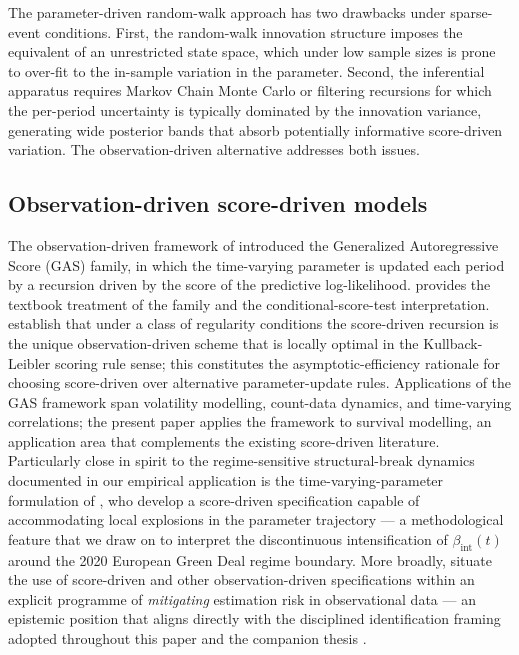 \documentclass[12pt,a4paper]{article}
\newcommand{\bint}{\beta_{\text{int}}}
\theoremstyle{plain}
\theoremstyle{definition}
\begin{document}
The parameter-driven random-walk approach has two drawbacks under sparse-event conditions. First, the random-walk innovation structure imposes the equivalent of an unrestricted state space, which under low sample sizes is prone to over-fit to the in-sample variation in the parameter. Second, the inferential apparatus requires Markov Chain Monte Carlo or filtering recursions for which the per-period uncertainty is typically dominated by the innovation variance, generating wide posterior bands that absorb potentially informative score-driven variation. The observation-driven alternative addresses both issues.

\subsection{Observation-driven score-driven models}

The observation-driven framework of \cite{creal2008general, creal2013generalized} introduced the Generalized Autoregressive Score (GAS) family, in which the time-varying parameter is updated each period by a recursion driven by the score of the predictive log-likelihood. \cite{harvey2013dynamic} provides the textbook treatment of the family and the conditional-score-test interpretation. \cite{blasques2015robust} establish that under a class of regularity conditions the score-driven recursion is the unique observation-driven scheme that is locally optimal in the Kullback-Leibler scoring rule sense; this constitutes the asymptotic-efficiency rationale for choosing score-driven over alternative parameter-update rules. Applications of the GAS framework span volatility modelling, count-data dynamics, and time-varying correlations; the present paper applies the framework to survival modelling, an application area that complements the existing score-driven literature. Particularly close in spirit to the regime-sensitive structural-break dynamics documented in our empirical application is the time-varying-parameter formulation of \citet{blasques2022local}, who develop a score-driven specification capable of accommodating local explosions in the parameter trajectory --- a methodological feature that we draw on to interpret the discontinuous intensification of $\bint(t)$ around the 2020 European Green Deal regime boundary. More broadly, \citet{blasques2024mitigating} situate the use of score-driven and other observation-driven specifications within an explicit programme of \emph{mitigating} estimation risk in observational data --- an epistemic position that aligns directly with the disciplined identification framing adopted throughout this paper and the companion thesis \citep{saakstra2026thesis}.
\end{document}
